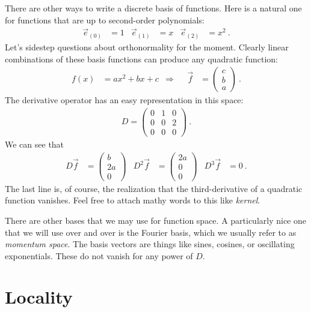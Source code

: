 \documentclass[
  11pt,
	colorful,
	raggedright,
]{tufte-style-thesis-flip}
\begin{document}
There are other ways to write a discrete basis of functions. Here is a natural one for functions that are up to second-order polynomials:
\begin{align}
  \vec{e}_{(0)} &= 1
  &
  \vec{e}_{(1)} &= x
  &
  \vec{e}_{(2)} &= x^2 \ .
\end{align}
Let’s sidestep questions about orthonormality for the moment. Clearly linear combinations of these basis functions can produce any quadratic function:
\begin{align}
  f(x) &= a x^2 + bx + c
  & \Rightarrow&&
  \vec{f} &=
  \begin{pmatrix}
     c \\ b \\ a
   \end{pmatrix} \ . 
\end{align}
The derivative operator has an easy representation in this space:
\begin{align}
  D = 
  \begin{pmatrix}
    0 & 1 & 0   \\
    0 & 0 & 2   \\
    0 & 0 & 0   
  \end{pmatrix} \ .
\end{align}
We can see that
\begin{align}
  D \vec{f}  &= 
  \begin{pmatrix}
     b \\
     2 a \\
     0
  \end{pmatrix} 
  &
  D^2 \vec{f}  &= 
  \begin{pmatrix}
     2a \\
     0 \\
     0
  \end{pmatrix} 
  &
  D^3 \vec{f}  &= 
  0 \ .
\end{align}
The last line is, of course, the realization that the third-derivative of a quadratic function vanishes. Feel free to attach mathy words to this like \emph{kernel}.

There are other bases that we may use for function space. A particularly nice one that we will use over and over is the Fourier basis, which we usually refer to as \emph{momentum space}. The basis vectors are things like sines, cosines, or oscillating exponentials. These do not vanish for any power of $D$.


\section{Locality}
\end{document}
